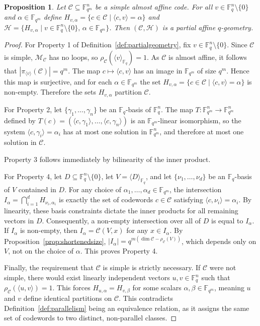 \documentclass[a4paper,11pt,reqno]{article}
\newcommand{\F}{\mathbb{F}}
\newcommand{\M}{\mathcal{M}}
\newcommand{\C}{\mathcal{C}}
\theoremstyle{plain} \numberwithin{equation}{section}
\newtheorem{proposition}[theorem]{Proposition}
\theoremstyle{definition}
\begin{document}
\begin{proposition}
    Let $\C\subseteq \F_{q^m}^n$ be a simple almost affine code. For all $v\in \F_q^n\setminus \{0\}$ and $\alpha \in \F_{q^m}$ define $H_{v,\alpha} = \{ c\in \C\mid \langle c,v\rangle = \alpha\}$ and $\mathcal{H} = \{H_{v,\alpha} \mid v\in \F_{q}^n\setminus\{0\}, \,\alpha \in \F_{q^m}\}$. Then $(\C,\mathcal{H})$ is a partial affine $q$-geometry.
\end{proposition}
\begin{proof}
    For Property 1 of Definition~\ref{def:partialgeometry}, fix $v\in \F_q^n\setminus \{0\}$. Since $\C$ is simple, $\M_\C$ has no loops, so $\rho_\C(\langle v\rangle _{\F_q})=1$. As $\C$ is almost affine, it follows that $|\pi_{\langle v \rangle}(\C)| = q^m$. The map $c\mapsto \langle c,v\rangle $ has an image in $\F_{q^m}$ of size $q^m$. Hence this map is surjective, and for each $\alpha \in \F_{q^m}$ the set $H_{v,\alpha} = \{c\in \C \mid \langle c,v\rangle = \alpha\}$ is non-empty. Therefore the sets $H_{v,\alpha}$ partition $\C$.
    
    For Property 2, let $\{\gamma_1,\ldots,\gamma_n\}$ be an $\F_q$-basis of $\F_q^n$. The map $T\colon \F_{q^m}^n\rightarrow \F_{q^m}^n$ defined by $T(c) = \left( \langle c,\gamma_1\rangle,\ldots,\langle c,\gamma_n\rangle\right)$ is an $\F_{q^m}$-linear isomorphism, so the system $\langle c,\gamma_i\rangle = \alpha_i$ has at most one solution in $\F_{q^m}^n$, and therefore at most one solution in $\C$.
    
    
    Property 3 follows immediately by bilinearity of the inner product. 

    For Property 4, let $D\subseteq \F_q^n\setminus\{0\}$, let $V= \langle D\rangle_{\F_q}$, and let $\{\nu_1,\ldots,\nu_d\}$ be an $\F_q$-basis of $V$ contained in $D$. For any choice of $\alpha_1,\ldots,\alpha_d \in \F_{q^m}$, the intersection $I_\alpha = \bigcap ^d _{i=1}H_{\nu_i,\alpha_i}$ is exactly the set of codewords $c\in \C$ satisfying $\langle c,\nu_i\rangle = \alpha_i$. By linearity, these basis constraints dictate the inner products for all remaining vectors in $D$. Consequently, a non-empty intersection over all of $D$ is equal to $I_\alpha$. If $I_\alpha$ is non-empty, then $I_\alpha = \C(V,x)$ for any $x\in I_\alpha$. By Proposition~\ref{prop:shortenedsize}, $|I_\alpha| = q^{m(\dim \C - \rho_\C(V))}$, which depends only on $V$, not on the choice of $\alpha$. This proves Property 4.

    Finally, the requirement that $\mathcal{C}$ is simple is strictly necessary. If $\mathcal{C}$ were not simple, there would exist linearly independent vectors $u, v \in \mathbb{F}_q^n$ such that $\rho_{\mathcal{C}}(\langle u, v \rangle) = 1$. This forces $H_{u, \alpha} = H_{v, \beta}$ for some scalars $\alpha, \beta \in \mathbb{F}_{q^m}$, meaning $u$ and $v$ define identical partitions on $\mathcal{C}$. This contradicts Definition~\ref{def:parallelism} being an equivalence relation, as it assigns the same set of codewords to two distinct, non-parallel classes.
\end{proof}
\end{document}
